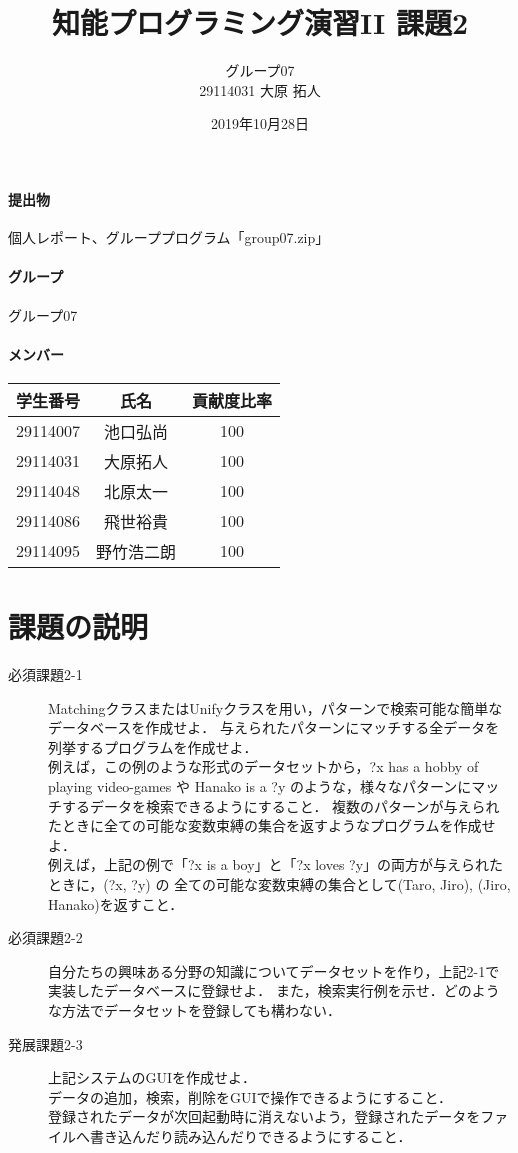 \documentclass{jarticle}
\title{知能プログラミング演習II 課題2}
\author{グループ07\\
    29114031 大原 拓人\\
}
\date{2019年10月28日}
\begin{document}
\maketitle

\paragraph{提出物} 個人レポート、グループプログラム「group07.zip」
\paragraph{グループ} グループ07
\paragraph{メンバー}
\begin{tabular}{|c|c|c|}
    \hline
    学生番号&氏名&貢献度比率\\
    \hline\hline
    29114007&池口弘尚&100\\
    \hline
    29114031&大原拓人&100\\
    \hline
    29114048&北原太一&100\\
    \hline
    29114086&飛世裕貴&100\\
    \hline
    29114095&野竹浩二朗&100\\
    \hline
\end{tabular}

\section{課題の説明}
\begin{description}
    \item[必須課題2-1] MatchingクラスまたはUnifyクラスを用い，パターンで検索可能な簡単なデータベースを作成せよ．
    与えられたパターンにマッチする全データを列挙するプログラムを作成せよ．
    \\ 例えば，この例のような形式のデータセットから，?x has a hobby of playing video-games や 
    Hanako is a ?y のような，様々なパターンにマッチするデータを検索できるようにすること．
    複数のパターンが与えられたときに全ての可能な変数束縛の集合を返すようなプログラムを作成せよ．
    \\ 例えば，上記の例で「?x is a boy」と「?x loves ?y」の両方が与えられたときに，(?x, ?y) の
    全ての可能な変数束縛の集合として{(Taro, Jiro), (Jiro, Hanako)}を返すこと．
    \item[必須課題2-2] 自分たちの興味ある分野の知識についてデータセットを作り，上記2-1で実装したデータベースに登録せよ．
    また，検索実行例を示せ．どのような方法でデータセットを登録しても構わない．
    \item[発展課題2-3] 上記システムのGUIを作成せよ．
    \\ データの追加，検索，削除をGUIで操作できるようにすること．
    \\ 登録されたデータが次回起動時に消えないよう，登録されたデータをファイルへ書き込んだり読み込んだりできるようにすること．
\end{description}
\end{document}
